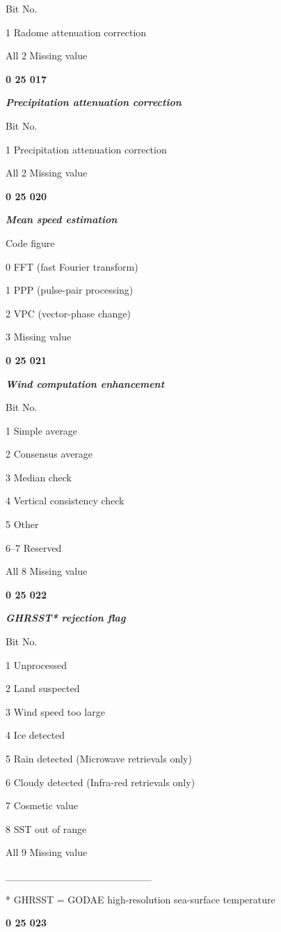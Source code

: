 Bit No.

1 Radome attenuation correction

All 2 Missing value

\textbf{0 25 017}

\emph{\textbf{Precipitation attenuation correction}}

Bit No.

1 Precipitation attenuation correction

All 2 Missing value

\textbf{0 25 020}

\emph{\textbf{Mean speed estimation}}

Code figure

0 FFT (fast Fourier transform)

1 PPP (pulse-pair processing)

2 VPC (vector-phase change)

3 Missing value

\textbf{0 25 021}

\emph{\textbf{Wind computation enhancement}}

Bit No.

1 Simple average

2 Consensus average

3 Median check

4 Vertical consistency check

5 Other

6--7 Reserved

All 8 Missing value

\textbf{0 25 022}

\emph{\textbf{GHRSST* rejection flag}}

Bit No.

1 Unprocessed

2 Land suspected

3 Wind speed too large

4 Ice detected

5 Rain detected (Microwave retrievals only)

6 Cloudy detected (Infra-red retrievals only)

7 Cosmetic value

8 SST out of range

All 9 Missing value

\_\_\_\_\_\_\_\_\_\_\_\_\_\_\_\_\_\_\_\_

* GHRSST = GODAE high-resolution sea-surface temperature

\textbf{0 25 023}

